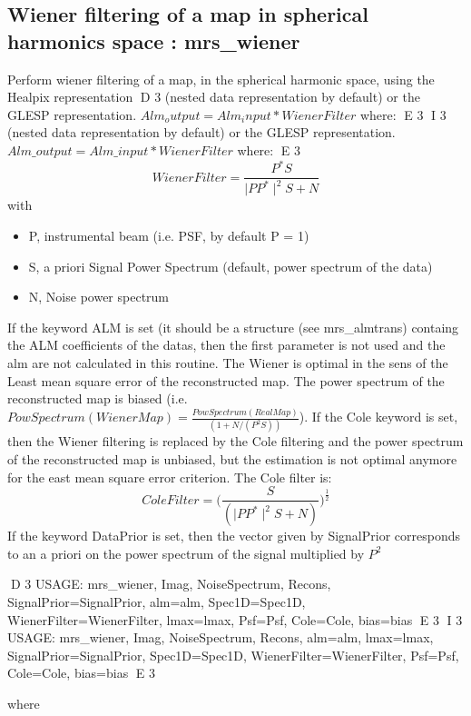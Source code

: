 \subsection{Wiener filtering of a map in spherical harmonics space : mrs\_wiener}
Perform wiener filtering of a map, in the spherical harmonic space, using the Healpix representation 
D 3
(nested data representation by default) or the GLESP representation. $Alm_output = Alm_input * WienerFilter$ where:
E 3
I 3
(nested data representation by default) or the GLESP representation. $Alm\_output = Alm\_input * WienerFilter$ where:
E 3
\[ WienerFilter =  \frac{ P^ * S}{ \mid P P^ * \mid^2 S + N } \]
with
\begin{itemize}
\item P, instrumental beam (i.e. PSF, by default P = 1)
\item S, a priori Signal Power Spectrum (default, power spectrum of the data)
\item N, Noise power spectrum
\end{itemize}
If the keyword ALM is set (it should be a structure (see mrs\_almtrans) containg the ALM coefficients of the datas, 
then the first parameter is not used and the alm are not calculated in this routine. The Wiener is optimal in the 
sens of the Least mean square error of the reconstructed map. The power spectrum of the reconstructed map is biased 
(i.e. $PowSpectrum(WienerMap) = \frac{PowSpectrum(RealMap)}{ (1 + N / (P^2S) ) }$). If the Cole keyword is set, then 
the Wiener filtering is replaced by the Cole filtering and the power spectrum of the reconstructed map is unbiased, 
but the estimation is not optimal anymore for the east mean square error criterion. The Cole filter is:
\[ ColeFilter =  \Big( \frac{S}{ ( \mid P P^* \mid^2 S + N ) } \Big)^{\frac{1}{2}} \]
If the keyword DataPrior is set, then the vector given by SignalPrior corresponds to an a priori on the power spectrum of the signal multiplied by $P^2$
{\bf
\begin{center}
D 3
     USAGE: mrs\_wiener, Imag, NoiseSpectrum, Recons, SignalPrior=SignalPrior, alm=alm, Spec1D=Spec1D, WienerFilter=WienerFilter, lmax=lmax, Psf=Psf, Cole=Cole, bias=bias
E 3
I 3
     USAGE: mrs\_wiener, Imag, NoiseSpectrum, Recons, alm=alm, lmax=lmax, SignalPrior=SignalPrior, Spec1D=Spec1D, WienerFilter=WienerFilter, Psf=Psf, Cole=Cole, bias=bias
E 3
\end{center}}
where
